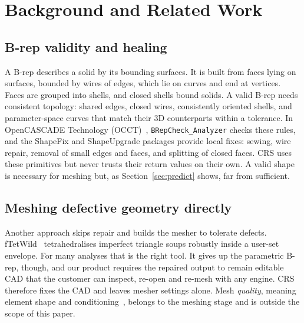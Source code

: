 \documentclass[11pt,onecolumn]{article}
\newcommand{\code}[1]{\texttt{\small #1}}
\begin{document}
\section{Background and Related Work}\label{sec:background}

\subsection{B-rep validity and healing}
A B-rep describes a solid by its bounding surfaces. It is built from faces lying on surfaces,
bounded by wires of edges, which lie on curves and end at vertices. Faces are grouped into shells,
and closed shells bound solids. A valid B-rep needs consistent topology: shared edges, closed wires,
consistently oriented shells, and parameter-space curves that match their 3D counterparts within a
tolerance. In OpenCASCADE Technology (OCCT)~\cite{occt}, \code{BRepCheck\_Analyzer} checks these
rules, and the ShapeFix and ShapeUpgrade packages provide local fixes: sewing, wire repair, removal
of small edges and faces, and splitting of closed faces. CRS uses these primitives but never trusts
their return values on their own. A valid shape is necessary for meshing but, as
Section~\ref{sec:predict} shows, far from sufficient.

\subsection{Meshing defective geometry directly}
Another approach skips repair and builds the mesher to tolerate defects. fTetWild~\cite{ftetwild}
tetrahedralises imperfect triangle soups robustly inside a user-set envelope. For many analyses that
is the right tool. It gives up the parametric B-rep, though, and our product requires the repaired
output to remain editable CAD that the customer can inspect, re-open and re-mesh with any engine.
CRS therefore fixes the CAD and leaves mesher settings alone. Mesh \emph{quality}, meaning element
shape and conditioning~\cite{shewchuk,knupp}, belongs to the meshing stage and is outside the scope
of this paper.
\end{document}
